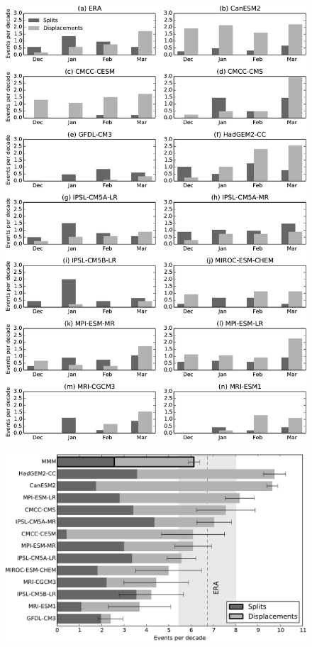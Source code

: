  \begin{figure}
 \centering
 \noindent\includegraphics[width=\textwidth]{figures/chapter-models/events_seasonal.pdf}
 \caption[]{}
 \label{Fig2}
 \end{figure}



 \begin{figure}
 \centering
 \noindent\includegraphics[width=\textwidth]{figures/chapter-models/events_bar_stacked.pdf}
 \caption[]{}
 \label{Fig2}
 \end{figure}



